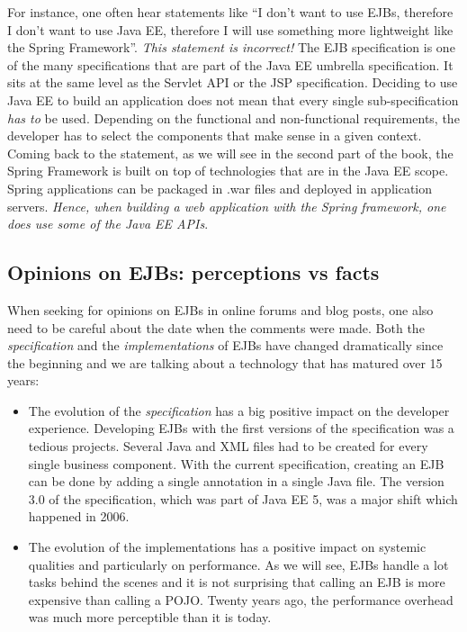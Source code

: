 For instance, one often hear statements like ``I don't want to use \ac{EJB}s, therefore I don't want to use \ac{Java EE}, therefore I will use something more lightweight like the Spring Framework''. \emph{This statement is incorrect!} The \ac{EJB} specification is one of the many specifications that are part of the \ac{Java EE} umbrella specification. It sits at the same level as the Servlet API or the \ac{JSP} specification. Deciding to use \ac{Java EE} to build an application does not mean that every single sub-specification \emph{has to} be used. Depending on the functional and non-functional requirements, the developer has to select the components that make sense in a given context. Coming back to the statement, as we will see in the second part of the book, the Spring Framework is built on top of technologies that are in the \ac{Java EE} scope. Spring applications can be packaged in .war files and deployed in application servers. \emph{Hence, when building a web application with the Spring framework, one does use some of the \ac{Java EE} APIs}.

\subsection{Opinions on EJBs: perceptions vs facts}


When seeking for opinions on \ac{EJB}s in online forums and blog posts, one also need to be careful about the date when the comments were made. Both the \emph{specification} and the \emph{implementations} of \ac{EJB}s have changed dramatically since the beginning and we are talking about a technology that has matured over 15 years:

\begin{itemize}
\item  The evolution of the \emph{specification} has a big positive impact on the developer experience. Developing \ac{EJB}s with the first versions of the specification was a tedious projects. Several Java and XML files had to be created for every single business component. With the current specification, creating an \ac{EJB} can be done by adding a single annotation in a single Java file. The version 3.0 of the specification, which was part of Java EE 5, was a major shift which happened in 2006.
\item The evolution of the implementations has a positive impact on systemic qualities and particularly on performance. As we will see, \ac{EJB}s handle a lot tasks behind the scenes and it is not surprising that calling an \ac{EJB} is more expensive than calling a \ac{POJO}. Twenty years ago, the performance overhead was much more perceptible than it is today. 
\end{itemize}

